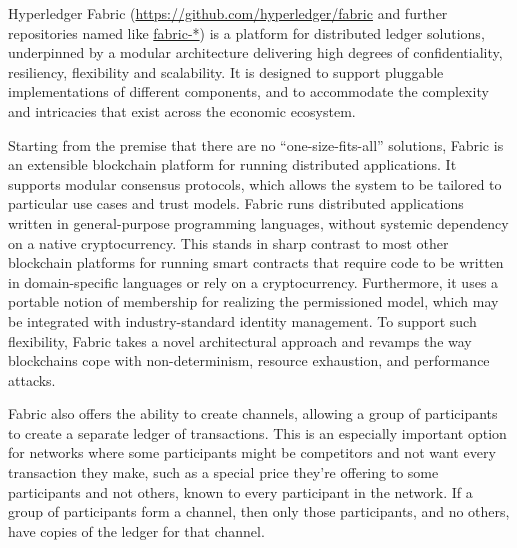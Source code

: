 Hyperledger Fabric (\url{https://github.com/hyperledger/fabric} and further repositories named like \url{fabric-*}) is a platform for distributed ledger solutions, underpinned by a modular architecture delivering high degrees of confidentiality, resiliency, flexibility and scalability. It is designed to support pluggable implementations of different components, and to accommodate the complexity and intricacies that exist across the economic ecosystem.

Starting from the premise that there are no ``one-size-fits-all'' solutions, Fabric is an extensible blockchain platform for running distributed applications.  It supports modular consensus protocols, which allows the system to be tailored to particular use cases and trust models. Fabric runs distributed applications written in general-purpose programming languages, without systemic dependency on a native cryptocurrency.  This stands in sharp contrast to most other blockchain platforms for running smart contracts that require code to be written in domain-specific languages or rely on a cryptocurrency.  Furthermore, it uses a portable notion of membership for realizing the permissioned model, which may be integrated with industry-standard identity management.  To support such flexibility, Fabric takes a novel architectural approach and revamps the way blockchains cope with non-determinism, resource exhaustion, and performance attacks.


Fabric also offers the ability to create channels, allowing a group of participants to create a separate ledger of transactions. This is an especially important option for networks where some participants might be competitors and not want every transaction they make, such as a special price they’re offering to some participants and not others, known to every participant in the network. If a group of participants form a channel, then only those participants, and no others, have copies of the ledger for that channel.
